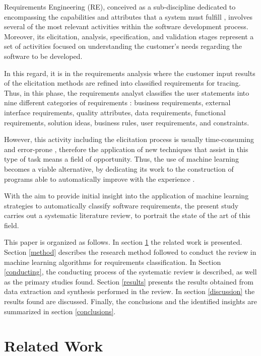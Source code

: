 \documentclass[conference]{IEEEtran}
\begin{document}
Requirements Engineering (RE), conceived as a sub-discipline dedicated to encompassing the capabilities and attributes that a system must fulfill \cite{Wiegers2013}, involves several of the most relevant activities within the software development process. Moreover, its elicitation, analysis, specification, and validation stages \cite{Kotonya:1998:REP:552009} represent a set of activities focused on understanding the customer's needs regarding the software to be developed.

In this regard, it is in the requirements analysis where the customer input results of the elicitation methods are refined into classified requirements for tracing. Thus, in this phase, the requirements analyst classifies the user statements into nine different categories of requirements \cite{Wiegers2013}: business requirements, external interface requirements, quality attributes, data requirements, functional requirements, solution ideas, business rules, user requirements, and constraints.

However, this activity including the elicitation process is usually time-consuming and error-prone \cite{Meth2013}, therefore the application of new techniques that assist in this type of task means a field of opportunity. Thus, the use of machine learning becomes a viable alternative, by dedicating its work to the construction of programs able to automatically improve with the experience \cite{Mitchell:1997:ML:541177}.

With the aim to provide initial insight into the application of machine learning strategies to automatically classify software requirements, the present study carries out a systematic literature review, to portrait the state of the art of this field.

This paper is organized as follows. In section \ref{related-work} the related work is presented. Section \ref{method} describes the research method followed to conduct the review in machine learning algorithms for requirements classification. In Section \ref{conducting}, the conducting process of the systematic review is described, as well as the primary studies found. Section \ref{results} presents the results obtained from data extraction and synthesis performed in the review. In section \ref{discussion} the results found are discussed. Finally, the conclusions and the identified insights are summarized in section \ref{conclusions}.

\section{Related Work}
\label{related-work}
\end{document}
